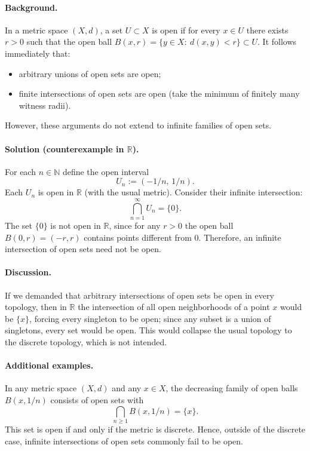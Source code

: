\documentclass[12pt,a4paper]{article}
\begin{document}
\paragraph{Background.}
In a metric space $(X,d)$, a set $U\subset X$ is open if for every $x\in U$ there exists $r>0$ such that the open ball $B(x,r)=\{y\in X:\ d(x,y)<r\}\subset U$. It follows immediately that:
\begin{itemize}
\item arbitrary unions of open sets are open;
\item finite intersections of open sets are open (take the minimum of finitely many witness radii).
\end{itemize}
However, these arguments do not extend to infinite families of open sets.

\paragraph{Solution (counterexample in $\mathbb{R}$).}
For each $n\in\mathbb{N}$ define the open interval
\[
U_n := (-1/n,\,1/n).
\]
Each $U_n$ is open in $\mathbb{R}$ (with the usual metric). Consider their infinite intersection:
\[
\bigcap_{n=1}^\infty U_n = \{0\}.
\]
The set $\{0\}$ is not open in $\mathbb{R}$, since for any $r>0$ the open ball $B(0,r)=(-r,r)$ contains points different from $0$. Therefore, an infinite intersection of open sets need not be open.

\paragraph{Discussion.}
If we demanded that arbitrary intersections of open sets be open in every topology, then in $\mathbb{R}$ the intersection of all open neighborhoods of a point $x$ would be $\{x\}$, forcing every singleton to be open; since any subset is a union of singletons, every set would be open. This would collapse the usual topology to the discrete topology, which is not intended.

\paragraph{Additional examples.}
In any metric space $(X,d)$ and any $x\in X$, the decreasing family of open balls $B(x,1/n)$ consists of open sets with
\[
\bigcap_{n\ge1} B(x,1/n) = \{x\}.
\]
This set is open if and only if the metric is discrete. Hence, outside of the discrete case, infinite intersections of open sets commonly fail to be open.
\end{document}
